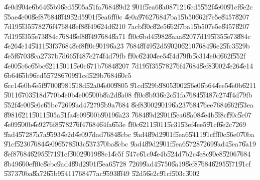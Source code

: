\U{4e0d}\U{904e}\U{6b64}\U{65b9}\U{6cd5}\U{505a}\U{51fa}\U{7684}\U{89d2}%
\U{901f}\U{5ea6}\U{8a08}\U{7121}\U{6cd5}\U{552f}\U{4e00}\U{91cf}\U{6e2c}%
\U{55ae}\U{4e00}\U{8ef8}\U{7684}\U{8f49}\U{52d5}\U{901f}\U{5ea6}\U{ff0c}%
\U{4e0a}\U{9762}\U{7684}\U{7ba1}\U{5b50}\U{662f}\U{7e5e}\U{8457}\U{8207}%
\U{7d19}\U{5f35}\U{5782}\U{76f4}\U{7684}\U{8ef8}\U{8f49}\U{624d}\U{6210}%
\U{7acb}\U{ff0c}\U{82e5}\U{662f}\U{7ba1}\U{5b50}\U{7e5e}\U{8457}\U{8207}%
\U{7d19}\U{5f35}\U{5e73}\U{884c}\U{7684}\U{8ef8}\U{8f49}\U{7684}\U{8a71}%
\U{ff0c}\U{6bd4}\U{5982}\U{8aaa}\U{8207}\U{7d19}\U{5f35}\U{5e73}\U{884c}%
\U{4e26}\U{4e14}\U{5411}\U{53f3}\U{7684}\U{8ef8}\U{ff0c}\U{9019}\U{6a23}%
\U{7684}\U{8f49}\U{52d5}\U{9020}\U{6210}\U{7684}\U{96e2}\U{5fc3}\U{529b}%
\U{4e5f}\U{6703}\U{8ca2}\U{737b}\U{7d66}\U{5f48}\U{7c27}\U{4f4d}\U{79fb}%
\U{ff0c}\U{6240}\U{4ee5}\U{4f4d}\U{79fb}\U{5c31}\U{4e0d}\U{662f}\U{552f}%
\U{4e00}\U{5c6c}\U{65bc}\U{6211}\U{5011}\U{5e0c}\U{671b}\U{7684}\U{8207}%
\U{7d19}\U{5f35}\U{5782}\U{76f4}\U{7684}\U{8ef8}\U{3002}\U{4e26}\U{4e14}%
\U{6b64}\U{65b9}\U{6cd5}\U{5728}\U{6709}\U{91cd}\U{529b}\U{7684}\U{60c5}%
\U{6cc1}\U{4e0b}\U{4e5f}\U{9700}\U{8981}\U{518d}\U{52a0}\U{4e00}\U{9805}%
\U{91cd}\U{529b}\U{9805}\U{3002}\U{56e0}\U{6b64}\U{4ee5}\U{4e0b}\U{6211}%
\U{5011}\U{6703}\U{518d}\U{770b}\U{4e0b}\U{4e00}\U{500b}\U{8a2d}\U{8a08}%
\U{ff0c}\U{8b93}\U{6e2c}\U{51fa}\U{7684}\U{5f48}\U{7c27}\U{4f4d}\U{79fb}%
\U{552f}\U{4e00}\U{5c6c}\U{65bc}\U{7269}\U{9ad4}\U{7279}\U{5b9a}\U{7684}%
\U{8ef8}\U{3002}\U{9019}\U{6a23}\U{7684}\U{76ee}\U{7684}\U{662f}\U{53ea}%
\U{8981}\U{6211}\U{5011}\U{505a}\U{51fa}\U{4e09}\U{500b}\U{9019}\U{6a23}%
\U{7684}\U{89d2}\U{901f}\U{5ea6}\U{8a08}\U{4e4b}\U{5f8c}\U{ff0c}\U{5c07}%
\U{4e09}\U{500b}\U{4e92}\U{76f8}\U{5782}\U{76f4}\U{7684}\U{64fa}\U{653e}%
\U{ff0c}\U{6211}\U{5011}\U{5c31}\U{53ef}\U{4ee5}\U{91cf}\U{6e2c}\U{7269}%
\U{9ad4}\U{5728}\U{7a7a}\U{9593}\U{4e2d}\U{4e09}\U{7dad}\U{7684}\U{8cbc}%
\U{9ad4}\U{89d2}\U{901f}\U{5ea6}\U{5411}\U{91cf}\U{ff0c}\U{56e0}\U{70ba}%
\U{91cf}\U{5230}\U{7684}\U{4e09}\U{6578}\U{503c}\U{5373}\U{70ba}\U{8cbc}%
\U{9ad4}\U{89d2}\U{901f}\U{5ea6}\U{5728}\U{7269}\U{9ad4}\U{5ea7}\U{6a19}%
\U{8ef8}\U{7684}\U{6295}\U{5f71}\U{91cf}\U{3002}\U{9019}\U{88e1}\U{4e5f}%
\U{547c}\U{61c9}\U{4e4b}\U{524d}\U{7b2c}\U{4e8c}\U{90e8}\U{5206}\U{7684}%
\U{8b49}\U{660e}\U{ff0c}\U{8cbc}\U{9ad4}\U{89d2}\U{901f}\U{5ea6}\U{5728}%
\U{7269}\U{9ad4}\U{5750}\U{6a19}\U{8ef8}\U{7684}\U{6295}\U{5f71}\U{91cf}%
\U{5373}\U{70ba}\U{8a72}\U{65b9}\U{5411}\U{7684}\U{77ac}\U{9593}\U{8f49}%
\U{52d5}\U{6e2c}\U{91cf}\U{503c}\U{3002}
